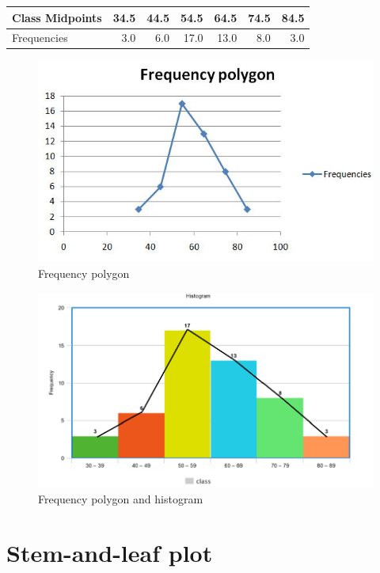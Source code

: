 \documentclass[
]{book}
\begin{document}
\begin{table}[H]
\centering
\begin{tabular}[t]{l|r|r|r|r|r|r}
\hline
Class Midpoints & 34.5 & 44.5 & 54.5 & 64.5 & 74.5 & 84.5\\
\hline
Frequencies & 3.0 & 6.0 & 17.0 & 13.0 & 8.0 & 3.0\\
\hline
\end{tabular}
\end{table}

\begin{figure}

{\centering \includegraphics[width=0.7\linewidth]{images/image11} 

}

\caption{Frequency polygon}\label{fig:freqpol}
\end{figure}

\begin{figure}

{\centering \includegraphics[width=0.7\linewidth]{images/image12} 

}

\caption{Frequency polygon and histogram}\label{fig:frehit}
\end{figure}

\hypertarget{stem-and-leaf-plot}{%
\section{Stem-and-leaf plot}\label{stem-and-leaf-plot}}
\end{document}
